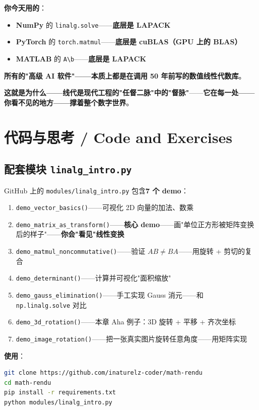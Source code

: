 \textbf{你今天用的}：

\begin{itemize}
\item \textbf{NumPy} 的 \texttt{linalg.solve}——\textbf{底层是 LAPACK}
\item \textbf{PyTorch} 的 \texttt{torch.matmul}——\textbf{底层是 cuBLAS（GPU 上的 BLAS）}
\item \textbf{MATLAB} 的 \texttt{A\textbackslash b}——\textbf{底层是 LAPACK}
\end{itemize}

\textbf{所有的"高级 AI 软件"——本质上都是在调用 50 年前写的数值线性代数库}。

\textbf{这就是为什么——线代是现代工程的"任督二脉"中的"督脉"}——\textbf{它在每一处——你看不见的地方——撑着整个数字世界}。

\section{代码与思考 / Code and Exercises}

\subsection{配套模块 \texttt{linalg\_intro.py}}

GitHub 上的 \texttt{modules/linalg\_intro.py} 包含\textbf{7 个 demo}：

\begin{enumerate}
\item \texttt{demo\_vector\_basics()}——可视化 2D 向量的加法、数乘
\item \texttt{demo\_matrix\_as\_transform()}——\textbf{核心 demo}——画"单位正方形被矩阵变换后的样子"——\textbf{你会"看见"线性变换}
\item \texttt{demo\_matmul\_noncommutative()}——验证 $AB \ne BA$——用旋转 + 剪切的复合
\item \texttt{demo\_determinant()}——计算并可视化"面积缩放"
\item \texttt{demo\_gauss\_elimination()}——手工实现 Gauss 消元——和 \texttt{np.linalg.solve} 对比
\item \texttt{demo\_3d\_rotation()}——本章 Aha 例子：3D 旋转 + 平移 + 齐次坐标
\item \texttt{demo\_image\_rotation()}——把一张真实图片旋转任意角度——用矩阵实现
\end{enumerate}

\textbf{使用}：

\begin{lstlisting}[language=bash]
git clone https://github.com/inaturelz-coder/math-rendu
cd math-rendu
pip install -r requirements.txt
python modules/linalg_intro.py
\end{lstlisting}

